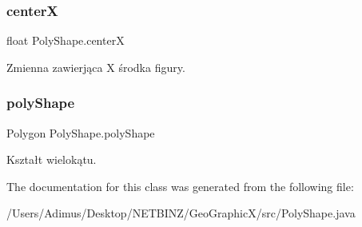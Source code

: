 \subsubsection{centerX}
{\footnotesize\ttfamily float Poly\+Shape.\+centerX\hspace{0.3cm}{\ttfamily [protected]}}

Zmienna zawierjąca X środka figury. \mbox{\label{class_poly_shape_a7115455fc518afe762f1aba1078ff4b2}} 
\subsubsection{poly\+Shape}
{\footnotesize\ttfamily Polygon Poly\+Shape.\+poly\+Shape\hspace{0.3cm}{\ttfamily [protected]}}

Kształt wielokątu. 

The documentation for this class was generated from the following file\+:\begin{DoxyCompactItemize}
\item 
/\+Users/\+Adimus/\+Desktop/\+N\+E\+T\+B\+I\+N\+Z/\+Geo\+Graphic\+X/src/Poly\+Shape.\+java\end{DoxyCompactItemize}
